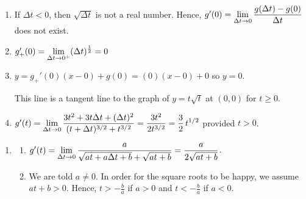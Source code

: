 \begin{enumerate}
\begin{enumerate}
\item  If $\Delta t < 0$, then $\sqrt{\Delta t}$ is not a real number.  Hence, $g'(0) = \displaystyle{\lim_{\Delta t \rightarrow 0} \dfrac{g(\Delta t) - g(0)}{\Delta t}}$ does not exist.

\item  $g_{+}'(0) =\displaystyle{ \lim_{\Delta t \rightarrow 0^{+}} (\Delta t)^{\frac{1}{2}}   =  0}$

\smallskip

\item  $y = g_{+}'(0) (x - 0) + g(0) =  (0) (x-0) + 0$ so $y = 0$.  

\smallskip

This line is a tangent line to the graph of $y = t \sqrt{t}$ at $(0,0)$ for $t \geq 0$.

\smallskip

\item  $g'(t) =\displaystyle{ \lim_{\Delta t \rightarrow 0}\dfrac{3t^2+3t\Delta t+(\Delta t)^2}{(t+\Delta t)^{3/2} + t^{3/2}} = \dfrac{3t^2}{2 t^{3/2}} = \dfrac{3}{2} \, t^{1/2}}$ provided $t > 0$.


\end{enumerate}


\setcounter{HW}{\value{enumi}}
\end{enumerate}

\begin{enumerate}
\setcounter{enumi}{\value{HW}}

\item  \begin{enumerate} \item  $g'(t) = \displaystyle{ \lim_{\Delta t \rightarrow 0} \dfrac{a}{\sqrt{at+a\Delta t+b} + \sqrt{at+b}} = \dfrac{a}{2 \sqrt{at+b}} }$.  

\smallskip

\item  We are told $a \neq 0$.  In order for the square roots to be happy, we assume $at + b > 0$.  Hence,   $t >  - \frac{b}{a}$ if $a>0$ and $t < -  \frac{b}{a}$ if $a<0$. 

\end{enumerate}

\setcounter{HW}{\value{enumi}}
\end{enumerate}


